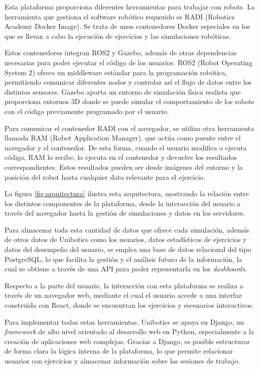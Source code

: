 \documentclass[a4paper, 12pt]{book}
\begin{document}
Esta plataforma proporciona diferentes herramientas para trabajar con robots. La herramienta que gestiona el software robótico requerido es RADI (Robotics Academy Docker Image). Se trata de unos contenedores Docker especiales en los que se llevan a cabo la ejecución de ejercicios y las simulaciones robóticas.

Estos contenedores integran ROS2 y Gazebo, además de otras dependencias necesarias para poder ejecutar el código de los usuarios. ROS2 (Robot Operating System 2) ofrece un middleware estándar para la programación robótica, permitiendo comunicar diferentes nodos y controlar así el flujo de datos entre los distintos sensores. Gazebo aporta un entorno de simulación física realista que proporciona entornos 3D donde se puede simular el comportamiento de los robots con el código previamente programado por el usuario.

Para comunicar el contenedor RADI con el navegador, se utiliza otra herramienta llamada RAM (Robot Application Manager), que actúa como puente entre el navegador y el contenedor. De esta forma, cuando el usuario modifica o ejecuta código, RAM lo recibe, lo ejecuta en el contenedor y devuelve los resultados correspondientes. Estos resultados pueden ser desde imágenes del entorno y la posición del robot hasta cualquier dato relevante para el ejercicio.

La figura \ref{fig:arquitectura} ilustra esta arquitectura, mostrando la relación entre los distintos componentes de la plataforma, desde la interacción del usuario a través del navegador hasta la gestión de simulaciones y datos en los servidores.

Para almacenar toda esta cantidad de datos que ofrece cada simulación, además de otros datos de Unibotics como los usuarios, datos estadísticos de ejercicios y datos del desempeño del usuario, se emplea una base de datos relacional del tipo PostgreSQL, lo que facilita la gestión y el análisis futuro de la información, la cual se obtiene a través de una API para poder representarla en los \textit{dashboards}.

Respecto a la parte del usuario, la interacción con esta plataforma se realiza a través de un navegador web, mediante el cual el usuario accede a una interfaz construida con React, donde se encuentran los ejercicios y escenarios interactivos.

Para implementar todas estas herramientas, Unibotics se apoya en Django, un \textit{framework} de alto nivel orientado al desarrollo web en Python, especialmente a la creación de aplicaciones web complejas. Gracias a Django, es posible estructurar de forma clara la lógica interna de la plataforma, lo que permite relacionar usuarios con ejercicios y almacenar información sobre las sesiones de trabajo.
\end{document}
